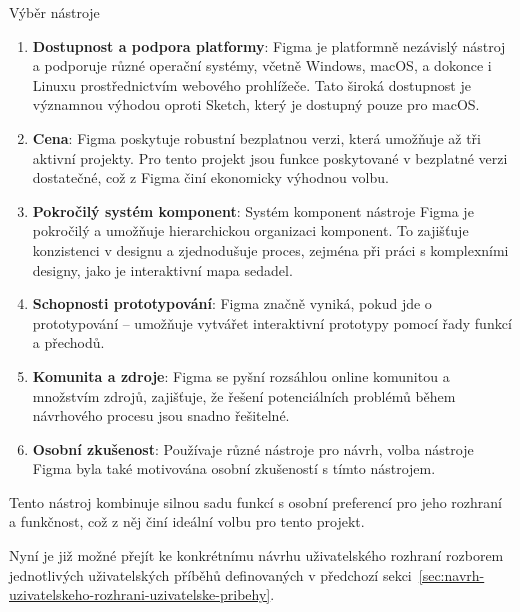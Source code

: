\begin{subsection}{Výběr nástroje}
    \begin{enumerate}
        \item \textbf{Dostupnost a podpora platformy}: Figma je platformně nezávislý nástroj a podporuje různé operační systémy, včetně Windows, macOS, a dokonce i Linuxu prostřednictvím webového prohlížeče.
        Tato široká dostupnost je významnou výhodou oproti Sketch, který je dostupný pouze pro macOS\@.
        \item \textbf{Cena}: Figma poskytuje robustní bezplatnou verzi, která umožňuje až tři aktivní projekty.
        Pro tento projekt jsou funkce poskytované v bezplatné verzi dostatečné, což z Figma činí ekonomicky výhodnou volbu.
        \item \textbf{Pokročilý systém komponent}: Systém komponent nástroje Figma je pokročilý a umožňuje hierarchickou organizaci komponent.
        To zajišťuje konzistenci v designu a zjednodušuje proces, zejména při práci s komplexními designy, jako je interaktivní mapa sedadel.
        \item \textbf{Schopnosti prototypování}: Figma značně vyniká, pokud jde o prototypování – umožňuje vytvářet interaktivní prototypy pomocí řady funkcí a přechodů.
        \item \textbf{Komunita a zdroje}: Figma se pyšní rozsáhlou online komunitou a množstvím zdrojů, zajišťuje, že řešení potenciálních problémů během návrhového procesu jsou snadno řešitelné.
        \item \textbf{Osobní zkušenost}: Používaje různé nástroje pro návrh, volba nástroje Figma byla také motivována osobní zkušeností s tímto nástrojem.
    \end{enumerate}

    Tento nástroj kombinuje silnou sadu funkcí s osobní preferencí pro jeho rozhraní a funkčnost, což z něj činí ideální volbu pro tento projekt.

    Nyní je již možné přejít ke konkrétnímu návrhu uživatelského rozhraní rozborem jednotlivých uživatelských příběhů definovaných v předchozí sekci~\ref{sec:navrh-uzivatelskeho-rozhrani-uzivatelske-pribehy}.
\end{subsection}
